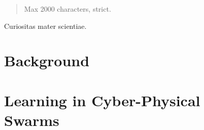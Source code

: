 \documentclass[12pt,a4paper,oneside]{book}
\begin{document}
	
\frontmatter



\begin{abstract}	
Max 2000 characters, strict.
\end{abstract}

\begin{dedication} %
Curiositas mater scientiae.
\end{dedication}

\begin{acknowledgements} %
\end{acknowledgements}
\dominitoc
\tableofcontents   
\listoffigures     %
\lstlistoflistings %



\mainmatter

\begin{refsection}\end{refsection}
\part{Background}
\begin{refsection}\end{refsection}
\begin{refsection}\end{refsection}
\begin{refsection}\end{refsection}

\part{Learning in Cyber-Physical Swarms}
\begin{refsection}\end{refsection}
\begin{refsection}\end{refsection}
\begin{refsection}\end{refsection}
\begin{refsection}\end{refsection}
\begin{refsection}\end{refsection}
\end{document}
